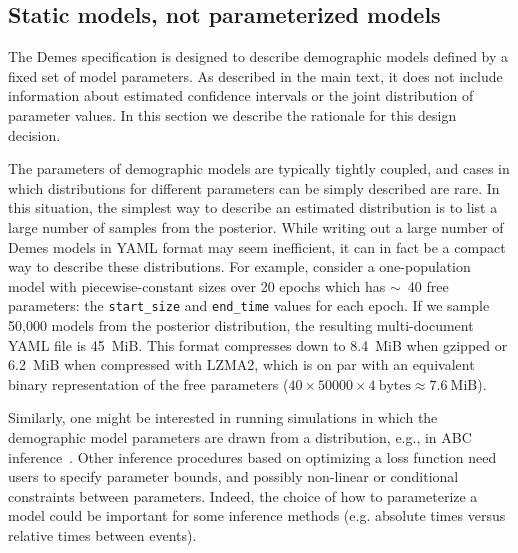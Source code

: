 \documentclass[11pt]{article}
\newcommand{\ggcomment}[1]{{\textcolor{yellow!60!red}{GG: #1}}}
\begin{document}
\subsection{Static models, not parameterized models}
\label{sec:appendix-static}

The Demes specification is designed to describe demographic
models defined by a fixed set of model parameters.
As described in the main text, it does not include
information about estimated confidence intervals or the joint distribution
of parameter values. In this section we describe the rationale
for this design decision.

The parameters of
demographic models are typically tightly coupled, and cases in which
distributions for different parameters can be simply described are rare.
In this situation, the simplest way to describe an estimated
distribution is to list a large number of samples from
the posterior. While writing out a large number of Demes models in
YAML format may seem inefficient, it can in fact be a compact
way to describe these distributions.
For example, consider a one-population model with piecewise-constant sizes over
20 epochs which has $\sim$~40 free parameters: the \texttt{start\_size} and
\texttt{end\_time} values for each epoch. If we sample 50,000 models
from the posterior distribution, the resulting multi-document YAML file is
45~MiB.
This format compresses down to 8.4~MiB when gzipped or 6.2~MiB
when compressed with LZMA2, which is on par with an equivalent binary
representation of the free parameters
($40\times50000\times4~\text{bytes} \approx 7.6~\text{MiB}$).

Similarly, one might be interested in running simulations in which
the demographic model parameters are drawn from a distribution, e.g.,
in ABC inference~\citep{beaumont2002approximate}.
Other inference procedures based on optimizing a loss function
\citep{gutenkunst2009inferring,kamm2017efficient,jouganous2017inferring,ragsdale2019models,excoffier2021fastsimcoal2}
need users to specify parameter bounds,
and possibly non-linear or conditional constraints between parameters.
Indeed, the choice of how to parameterize a model could be important for
some inference methods (e.g. absolute times versus relative times between events).
\end{document}
